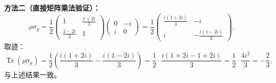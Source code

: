 \begin{solution}
\textbf{方法二（直接矩阵乘法验证）：}
\[
\rho\sigma_y = \frac{1}{2}\begin{pmatrix}
1 & \frac{1+2i}{3} \\[4pt]
\frac{1-2i}{3} & 1
\end{pmatrix}
\begin{pmatrix}
0 & -i \\ i & 0
\end{pmatrix}
= \frac{1}{2}\begin{pmatrix}
\frac{i(1+2i)}{3} & -i \\[4pt]
i & -\frac{i(1-2i)}{3}
\end{pmatrix},
\]
取迹：
\[
\operatorname{Tr}(\rho\sigma_y) = \frac{1}{2}\left(\frac{i(1+2i)}{3} - \frac{i(1-2i)}{3}\right)
= \frac{1}{2}\cdot\frac{i(1+2i-1+2i)}{3}
= \frac{1}{2}\cdot\frac{4i^2}{3} = -\frac{2}{3},
\]
与上述结果一致。
\end{solution}

